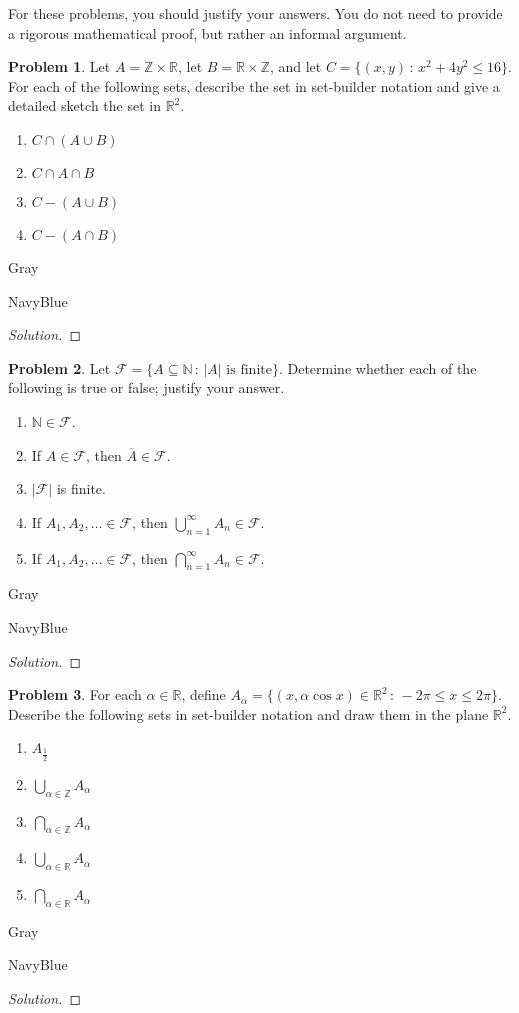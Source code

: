 \documentclass[12pt]{amsart}
\newcounter{problem_number}[section]
\theoremstyle{named}
\newenvironment{soln}
{\begin{color}{Gray}\begin{framed}\begin{color}{NavyBlue}\begin{proof}[Solution]
\doublespacing}
{\end{proof}\end{color}\end{framed}\end{color}}
\theoremstyle{definition}
\newtheorem{problem}{Problem}
\newcommand{\N}{\mathbb N}
\newcommand{\R}{\mathbb R}
\newcommand{\Z}{\mathbb Z}
\newcommand{\Ff}{\mathcal F}
\begin{document}
For these problems, you should justify your answers. You do not need to provide a rigorous mathematical proof, but rather an informal argument.

\begin{problem}
	Let $A = \Z\times\R$, let $B = \R\times\Z$, and let $C = \{(x,y)\,:\, x^2+4y^2\leq 16\}$.
	For each of the following sets, describe the set in set-builder notation and give a detailed sketch the set in $\R^2$.
	\begin{enumerate}
		\item $C\cap (A\cup B)$
		\item $C\cap A\cap B$
		\item $C - (A\cup B)$
		\item $C - (A\cap B)$
	\end{enumerate}
\end{problem}

\begin{soln}
	
\end{soln}
\begin{problem}
	Let $\Ff = \{A\subseteq\N\,:\,|A| \text{ is finite}\}$.
	Determine whether each of the following is true or false; justify your answer.
	\begin{enumerate}
		\item $\N\in\Ff$.
		\item If $A\in\Ff$, then $\overline A\in\Ff$.
		\item $|\Ff|$ is finite.
		\item If $A_1, A_2,\ldots \in\Ff$, then $\displaystyle\bigcup_{n=1}^\infty A_n\in\Ff$.
		\item If $A_1, A_2,\ldots \in\Ff$, then $\displaystyle\bigcap_{n=1}^\infty A_n\in\Ff$.
	\end{enumerate}
	
\end{problem}

\begin{soln}
	
\end{soln}

\begin{problem}
	For each $\alpha\in\R$, define $A_\alpha = \{(x,\alpha\cos x)\in\R^2\,:\, -2\pi\leq x\leq 2\pi\}$.
	Describe the following sets in set-builder notation and draw them in the plane $\R^2$.
	\begin{enumerate}
		\item $\displaystyle A_\frac{1}{2}$
		\item $\displaystyle\bigcup_{\alpha\in\Z} A_\alpha$
		\item $\displaystyle\bigcap_{\alpha\in\Z} A_\alpha$
		\item $\displaystyle\bigcup_{\alpha\in\R} A_\alpha$
		\item $\displaystyle\bigcap_{\alpha\in\R} A_\alpha$
	\end{enumerate}
\end{problem}

\begin{soln}
	
\end{soln}
\end{document}
